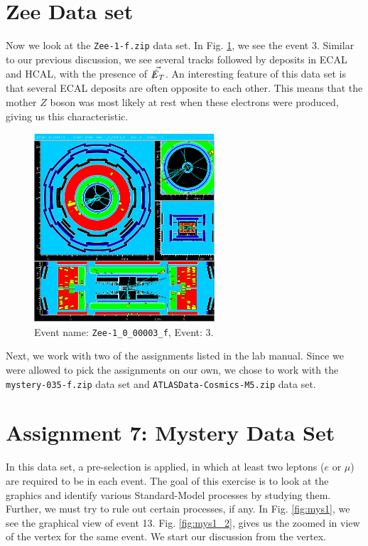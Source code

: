 \documentclass[a4paper]{report}
\numberwithin{equation}{section}
\begin{document}
\section{Zee Data set}

Now we look at the \texttt{Zee-1-f.zip} data set. In Fig. \ref{fig:zee}, we see the event 3. Similar to our previous discussion, we see several tracks followed by deposits in ECAL and HCAL, with the presence of $\vec{\slashed{E}_T}$. An interesting feature of this data set is that several ECAL deposits are often opposite to each other. This means that the mother $Z$ boson was most likely at rest when these electrons were produced, giving us this characteristic. 

\begin{figure}[htpb]
    \centering
    \includegraphics[width=0.6\textwidth]{Zee-1_0_00003_f-YX-RZ-RZ-YX-2022-05-23-13-23-32}
    \caption{Event name: \texttt{Zee-1\_0\_00003\_f}, Event: 3.}
    \label{fig:zee}
\end{figure}


Next, we work with two of the assignments listed in the lab manual. Since we were allowed to pick the assignments on our own, we chose to work with the \texttt{mystery-035-f.zip} data set and \texttt{ATLASData-Cosmics-M5.zip} data set. 

\section{Assignment 7: Mystery Data Set}  \label{subsec:mystery}
In this data set, a pre-selection is applied, in which at least two leptons ($e$ or $\mu$) are required to be in each event. The goal of this exercise is to look at the graphics and identify various Standard-Model processes by studying them. Further, we must try to rule out certain processes, if any. In Fig. \ref{fig:mys1}, we see the graphical view of event 13. Fig. \ref{fig:mys1_2}, gives us the zoomed in view of the vertex for the same event. We start our discussion from the vertex. 
\end{document}
